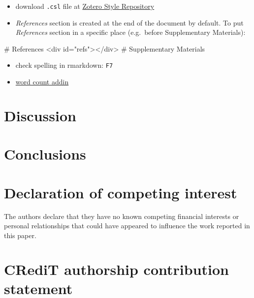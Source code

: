 \documentclass[review]{elsarticle} %
\providecommand{\tightlist}{%
  \setlength{\itemsep}{0pt}\setlength{\parskip}{0pt}}
\newenvironment{Shaded}{\begin{snugshade}}{\end{snugshade}}
\newcommand{\FunctionTok}[1]{\textcolor[rgb]{0.00,0.00,0.00}{#1}}
\newcommand{\NormalTok}[1]{#1}
\begin{document}
\begin{itemize}
\tightlist
\item
  download \texttt{.csl} file at
  \href{https://www.zotero.org/styles}{Zotero Style Repository}
\item
  \emph{References} section is created at the end of the document by
  default. To put \emph{References} section in a specific place
  (e.g.~before Supplementary Materials):
\end{itemize}

\begin{Shaded}
\begin{Highlighting}[]
\FunctionTok{# References}
\NormalTok{<div id="refs"></div>}
\FunctionTok{# Supplementary Materials}
\end{Highlighting}
\end{Shaded}

\begin{itemize}
\tightlist
\item
  check spelling in rmarkdown: \texttt{F7}
\item
  \href{https://github.com/benmarwick/wordcountaddin}{word count addin}
\end{itemize}

\section{Discussion}\label{discussion}

\section{Conclusions}\label{conclusion}

\newpage

\section*{Declaration of competing interest}\label{interest}

The authors declare that they have no known competing financial
interests or personal relationships that could have appeared to
influence the work reported in this paper.

\section*{CRediT authorship contribution statement}\label{credit}
\end{document}
